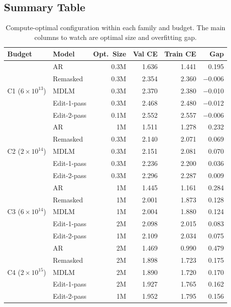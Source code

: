 \documentclass[11pt,a4paper]{article}
\begin{document}
\subsection{Summary Table}

\begin{table}[H]
\centering
\caption{Compute-optimal configuration within each family and budget. The main columns to watch are optimal size and overfitting gap.}
\label{tab:isoflop-optimal}
\begin{tabular}{llrrrr}
\toprule
Budget & Model & Opt.\ Size & Val CE & Train CE & Gap \\
\midrule
\multirow{5}{*}{C1 ($6\!\times\!10^{13}$)} & AR & 0.3M & 1.636 & 1.441 & 0.195 \\
& Remasked & 0.3M & 2.354 & 2.360 & $-$0.006 \\
& MDLM & 0.3M & 2.370 & 2.380 & $-$0.010 \\
& Edit-1-pass & 0.3M & 2.468 & 2.480 & $-$0.012 \\
& Edit-2-pass & 0.1M & 2.552 & 2.557 & $-$0.006 \\
\midrule
\multirow{5}{*}{C2 ($2\!\times\!10^{14}$)} & AR & 1M & 1.511 & 1.278 & 0.232 \\
& Remasked & 0.3M & 2.140 & 2.071 & 0.069 \\
& MDLM & 0.3M & 2.151 & 2.081 & 0.070 \\
& Edit-1-pass & 0.3M & 2.236 & 2.200 & 0.036 \\
& Edit-2-pass & 0.3M & 2.296 & 2.287 & 0.009 \\
\midrule
\multirow{5}{*}{C3 ($6\!\times\!10^{14}$)} & AR & 1M & 1.445 & 1.161 & 0.284 \\
& Remasked & 1M & 2.001 & 1.873 & 0.128 \\
& MDLM & 1M & 2.004 & 1.880 & 0.124 \\
& Edit-1-pass & 2M & 2.098 & 2.015 & 0.083 \\
& Edit-2-pass & 1M & 2.109 & 2.034 & 0.075 \\
\midrule
\multirow{5}{*}{C4 ($2\!\times\!10^{15}$)} & AR & 2M & 1.469 & 0.990 & 0.479 \\
& Remasked & 2M & 1.898 & 1.723 & 0.175 \\
& MDLM & 2M & 1.890 & 1.720 & 0.170 \\
& Edit-1-pass & 2M & 1.927 & 1.765 & 0.162 \\
& Edit-2-pass & 1M & 1.952 & 1.795 & 0.156 \\
\bottomrule
\end{tabular}
\end{table}
\end{document}

